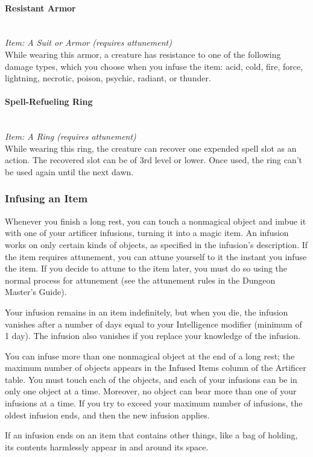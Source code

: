 \documentclass[letterpaper,openany,oneside,twocolumn]{book}
\begin{document}
\paragraph*{Resistant Armor}\hfill\\
\textit{Item: A Suit or Armor (requires attunement)}\\
While wearing this armor, a creature has resistance to one of the following damage types, which you choose when you infuse the item: acid, cold, fire, force, lightning, necrotic, poison, psychic, radiant, or thunder.
\paragraph*{Spell-Refueling Ring}\hfill\\
\textit{Item: A Ring (requires attunement)}\\
While wearing this ring, the creature can recover one expended spell slot as an action. The recovered slot can be of 3rd level or lower. Once used, the ring can't be used again until the next dawn.
\subsubsection*{Infusing an Item}
Whenever you finish a long rest, you can touch a nonmagical object and imbue it with one of your artificer infusions, turning it into a magic item. An infusion works on only certain kinds of objects, as specified in the infusion's description. If the item requires attunement, you can attune yourself to it the instant you infuse the item. If you decide to attune to the item later, you must do so using the normal process for attunement (see the attunement rules in the Dungeon Master's Guide).

Your infusion remains in an item indefinitely, but when you die, the infusion vanishes after a number of days equal to your Intelligence modifier (minimum of 1 day). The infusion also vanishes if you replace your knowledge of the infusion.

You can infuse more than one nonmagical object at the end of a long rest; the maximum number of objects appears in the Infused Items column of the Artificer table. You must touch each of the objects, and each of your infusions can be in only one object at a time. Moreover, no object can bear more than one of your infusions at a time. If you try to exceed your maximum number of infusions, the oldest infusion ends, and then the new infusion applies.

If an infusion ends on an item that contains other things, like a bag of holding, its contents harmlessly appear in and around its space.
\end{document}
